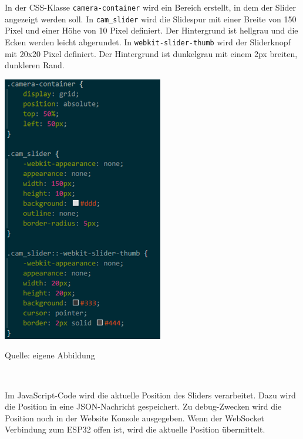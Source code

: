 \documentclass[ngerman,12pt,a4paper]{article}
\begin{document}
	In der CSS-Klasse \texttt{camera-container} wird ein Bereich erstellt, in dem der Slider angezeigt werden soll.  In \texttt{cam\_slider} wird die Slidespur mit einer Breite von 150 Pixel und einer Höhe von 10 Pixel definiert. Der Hintergrund ist hellgrau und die Ecken werden leicht abgerundet.  In \texttt{webkit-slider-thumb} wird der Sliderknopf mit 20x20 Pixel definiert. Der Hintergrund ist dunkelgrau mit einem 2px breiten, dunkleren Rand. \\
	\begin{center}
		\begin{minipage}[t]{0.5\textwidth}
			\includegraphics{Pictures/kamera-css}
			\label{fig:kamera-css}
			\vspace{-10pt}
			\begin{center}
				\par\small Quelle: eigene Abbildung 
			\end{center}
		\end{minipage} \\[0.75cm]
	\end{center}
	Im JavaScript-Code wird die aktuelle Position des Sliders verarbeitet. Dazu wird die Position in eine JSON-Nachricht gespeichert. Zu debug-Zwecken wird die Position noch in der Website Konsole ausgegeben. Wenn der WebSocket Verbindung zum ESP32 offen ist, wird die aktuelle Position übermittelt. \\[0.5cm]
\end{document}
